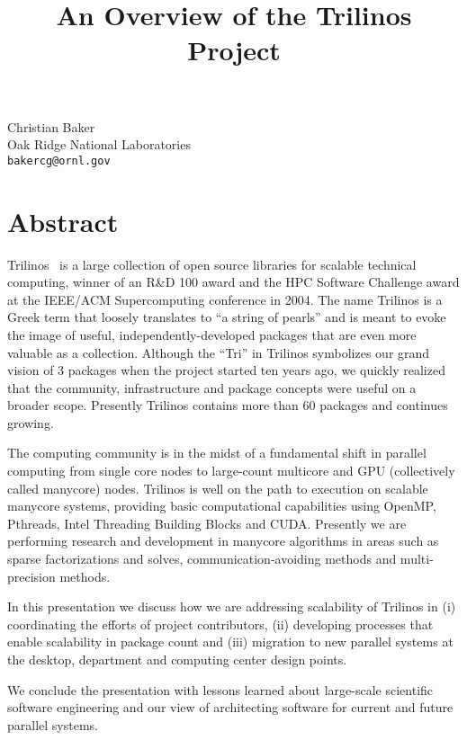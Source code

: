 \title{An Overview of the Trilinos Project}
\author{}  \institute{}
\maketitle
\begin{center}
{\large Christian Baker}\\
Oak Ridge National Laboratories\\
{\tt bakercg@ornl.gov}

\end{center}

\section*{Abstract}


Trilinos~\cite{trilinoshomepage,Trilinos-Overview-TOMS} is a large collection of open source libraries for scalable technical computing, winner of an R\&D 100 award and the HPC Software Challenge award at the IEEE/ACM Supercomputing conference in 2004.  The name Trilinos is a Greek term that loosely translates to ``a string of pearls'' and is meant to evoke the image of useful, independently-developed packages that are even more valuable as a collection.  Although the ``Tri'' in Trilinos symbolizes our grand vision of 3 packages when the project started ten years ago, we quickly realized that the community, infrastructure and package concepts were useful on a broader scope.  Presently Trilinos contains more than 60 packages and continues growing.  

The computing community is in the midst of a fundamental shift in parallel computing from single core nodes to large-count multicore and GPU (collectively called manycore) nodes.  Trilinos is well on the path to execution on scalable manycore systems, providing basic computational capabilities using OpenMP, Pthreads, Intel Threading Building Blocks and CUDA.  Presently we are performing research and development in manycore algorithms in areas such as sparse factorizations and solves, communication-avoiding methods and multi-precision methods.

In this presentation we discuss how we are addressing scalability of Trilinos in (i) coordinating the efforts of project contributors, (ii) developing processes that enable scalability in package count and (iii) migration to new parallel systems at the desktop, department and computing center design points.

We conclude the presentation with lessons learned about large-scale scientific software engineering and our view of architecting software for current and future parallel systems.




